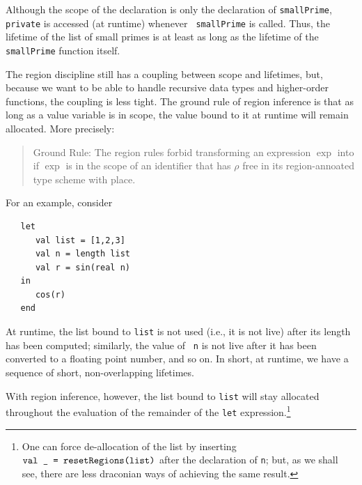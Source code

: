 \documentclass[12pt]{book}
\begin{document}
Although the scope of the declaration is only the declaration of 
%
{\tt smallPrime}, {\tt private} is accessed (at runtime) whenever {\tt
  smallPrime} is called.  Thus, the lifetime of the list of small
primes is at least as long as the lifetime of the {\tt smallPrime}
function itself.

The region discipline still has a coupling between scope and
lifetimes, but, because we want to be able to handle recursive data
types and higher-order functions, the coupling is less tight.  The
ground rule of region inference
%
%
is that as long as a value variable is in scope, the value bound to it
at runtime will remain allocated. More precisely:
\begin{quote}
  Ground Rule: The region rules forbid transforming an expression
  $\exp$ into  if $\exp$ is in
  the scope of an identifier that has $\rho$ free in its
  region-annoated type scheme with place.
\end{quote}
For an example, consider
\begin{verbatim}
   let 
      val list = [1,2,3]
      val n = length list
      val r = sin(real n)
   in
      cos(r)
   end
\end{verbatim} 
At runtime, the list bound to {\tt list} is not used (i.e., it is not
live) after its length has been computed; similarly, the value of {\tt
  n} is not live after it has been converted to a floating point
number, and so on. In short, at runtime, we have a sequence of short,
non-overlapping lifetimes.

With region inference, however, the list bound to {\tt list} will stay
allocated throughout the evaluation of the remainder of the {\tt let}
expression.\footnote{One can force de-allocation of the list by
  inserting $\hbox{\tt val \_ = \hbox{\tt resetRegions}(list)}$ after the declaration of
  {\tt n}; but, as we shall see, there are less draconian ways of
  achieving the same result.}
\end{document}
